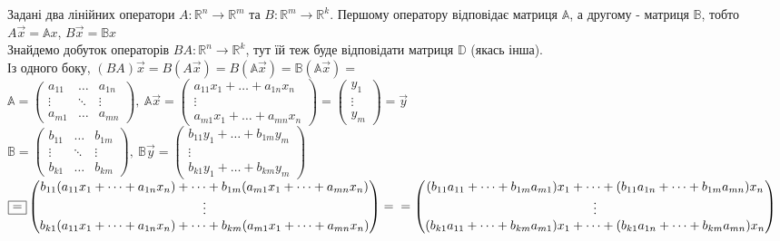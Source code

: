 \documentclass[a4paper, 10pt]{article}
\theoremstyle{theoremdd}
\begin{document}
	\noindent
	Задані два лінійних оператори $A \colon \mathbb{R}^n \to \mathbb{R}^m$ та $B \colon \mathbb{R}^m \to \mathbb{R}^k$. Першому оператору відповідає матриця $\mathbb{A}$, а другому - матриця $\mathbb{B}$, тобто\\
	$A\vec{x}=\mathbb{A}x$, $B\vec{x}=\mathbb{B}x$\\
	Знайдемо добуток операторів $BA \colon \mathbb{R}^n \to \mathbb{R}^k$, тут їй теж буде відповідати матриця $\mathbb{D}$ (якась інша).\\
	Із одного боку,
	$(BA)\vec{x} = B(A\vec{x}) = B(\mathbb{A}\vec{x}) = \mathbb{B}(\mathbb{A}\vec{x}) \boxed{=} $\\
	$
	\mathbb{A} = \begin{pmatrix}
	a_{11} & \dots & a_{1n}\\
	\vdots & \ddots & \vdots \\
	a_{m1} & \dots & a_{mn}
	\end{pmatrix},\
	\mathbb{A}\vec{x} = \begin{pmatrix}
	a_{11}x_1 + \dots + a_{1n}x_n \\
	\vdots \\
	a_{m1}x_1 + \dots + a_{mn}x_n
	\end{pmatrix} = \begin{pmatrix}
	y_1\\
	\vdots \\
	y_m
	\end{pmatrix} = \vec{y}$\\
	$\mathbb{B} = \begin{pmatrix}
	b_{11} & \dots & b_{1m}\\
	\vdots & \ddots & \vdots \\
	b_{k1} & \dots & b_{km}
	\end{pmatrix},\ \mathbb{B}\vec{y} = \begin{pmatrix}
	b_{11}y_1 + \dots + b_{1m}y_m \\
	\vdots \\
	b_{k1}y_1 + \dots + b_{km}y_m
	\end{pmatrix}$\\
	$
	\boxed{=} \begin{pmatrix}
	b_{11}(a_{11}x_1 + \dots + a_{1n}x_n) + \dots + b_{1m}(a_{m1}x_1 + \dots + a_{mn}x_n) \\
	\vdots \\
	b_{k1}(a_{11}x_1 + \dots + a_{1n}x_n) + \dots + b_{km}(a_{m1}x_1 + \dots + a_{mn}x_n)
	\end{pmatrix} = \\ = \begin{pmatrix}
	(b_{11}a_{11} + \dots + b_{1m}a_{m1})x_1 + \dots + (b_{11}a_{1n} + \dots + b_{1m}a_{mn})x_n \\
	\vdots \\
	(b_{k1}a_{11} + \dots + b_{km}a_{m1})x_1 + \dots + (b_{k1}a_{1n} + \dots + b_{km}a_{mn})x_n \\
	\end{pmatrix}$\\
\end{document}
